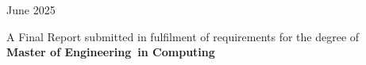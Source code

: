 \documentclass[11pt,a4paper,oneside]{book}
\newcommand{\reportdegree}{Master of Engineering}
\newcommand{\reportcourse}{Computing}
\newcommand{\reportyear}{2025}
\begin{document}
\begin{titlepage}
\begin{center}
        \vspace{1.5cm}
        
        {\large June \reportyear}
        
        \vfill
        
        \vspace{1cm}
        A Final Report submitted in fulfilment of requirements for the degree of\\[0.15cm]
        \textbf{\reportdegree\ in \reportcourse}
        
        \vspace{2.5cm}
    \end{center}
\end{titlepage}

\pagestyle{frontmatter}





\cleardoublepage
{}
{}
\renewcommand{\contentsname}{\hfill Contents}
\tableofcontents


\cleardoublepage
{}
{}
\renewcommand{\listfigurename}{\hfill List of Figures}
\listoffigures


\mainmatter
\pagestyle{main}








\backmatter

\printbibliography[heading=bibintoc,title={References}]



% 
% 
% 
\end{document}
